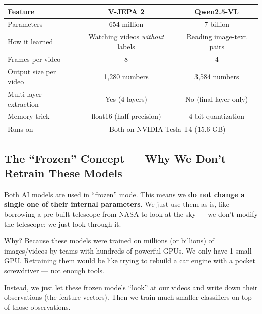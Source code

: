 \documentclass[12pt, a4paper]{article}
\begin{document}
\begin{warnbox}
\begin{center}
\renewcommand{\arraystretch}{1.4}
\begin{tabular}{lcc}
\toprule
\textbf{Feature} & \textbf{V-JEPA 2} & \textbf{Qwen2.5-VL} \\
\midrule
Parameters & 654 million & 7 billion \\
How it learned & Watching videos \textit{without} labels & Reading image-text pairs \\
Frames per video & 8 & 4 \\
Output size per video & 1,280 numbers & 3,584 numbers \\
Multi-layer extraction & Yes (4 layers) & No (final layer only) \\
Memory trick & float16 (half precision) & 4-bit quantization \\
Runs on & \multicolumn{2}{c}{Both on NVIDIA Tesla T4 (15.6 GB)} \\
\bottomrule
\end{tabular}
\end{center}
\end{warnbox}

\subsection{The ``Frozen'' Concept — Why We Don't Retrain These Models}

\begin{analogybox}
Both AI models are used in ``frozen'' mode. This means we \textbf{do not change a single one of their internal parameters}. We just use them as-is, like borrowing a pre-built telescope from NASA to look at the sky — we don't modify the telescope; we just look through it.

Why? Because these models were trained on millions (or billions) of images/videos by teams with hundreds of powerful GPUs. We only have 1 small GPU. Retraining them would be like trying to rebuild a car engine with a pocket screwdriver — not enough tools.

Instead, we just let these frozen models ``look'' at our videos and write down their observations (the feature vectors). Then we train much smaller classifiers on top of those observations.
\end{analogybox}

\newpage
\end{document}
